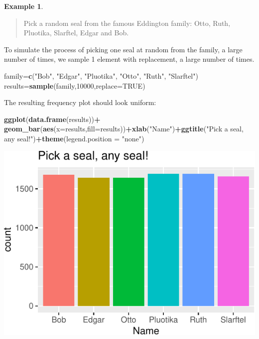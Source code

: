\documentclass[
]{book}
\newenvironment{Shaded}{\begin{snugshade}}{\end{snugshade}}
\newcommand{\AttributeTok}[1]{\textcolor[rgb]{0.13,0.29,0.53}{#1}}
\newcommand{\ConstantTok}[1]{\textcolor[rgb]{0.56,0.35,0.01}{#1}}
\newcommand{\DecValTok}[1]{\textcolor[rgb]{0.00,0.00,0.81}{#1}}
\newcommand{\FunctionTok}[1]{\textcolor[rgb]{0.13,0.29,0.53}{\textbf{#1}}}
\newcommand{\NormalTok}[1]{#1}
\newcommand{\OtherTok}[1]{\textcolor[rgb]{0.56,0.35,0.01}{#1}}
\newcommand{\SpecialCharTok}[1]{\textcolor[rgb]{0.81,0.36,0.00}{\textbf{#1}}}
\newcommand{\StringTok}[1]{\textcolor[rgb]{0.31,0.60,0.02}{#1}}
\theoremstyle{definition}
\theoremstyle{definition}
\newtheorem{example}{Example}[chapter]
\theoremstyle{definition}
\theoremstyle{definition}
\theoremstyle{remark}
\begin{document}
\begin{example}
\protect\hypertarget{exm:seals-uniform-R}{}\label{exm:seals-uniform-R}\leavevmode

\begin{quote}
Pick a random seal from the famous Eddington family: Otto, Ruth, Pluotika, Slarftel, Edgar and Bob.
\end{quote}

To simulate the process of picking one seal at random from the family, a large number of times, we sample 1 element with replacement, a large number of times.

\begin{Shaded}
\begin{Highlighting}[]
\NormalTok{family}\OtherTok{=}\FunctionTok{c}\NormalTok{(}\StringTok{"Bob"}\NormalTok{, }\StringTok{"Edgar"}\NormalTok{, }\StringTok{"Pluotika"}\NormalTok{, }\StringTok{"Otto"}\NormalTok{, }\StringTok{"Ruth"}\NormalTok{, }\StringTok{"Slarftel"}\NormalTok{)}
\NormalTok{results}\OtherTok{=}\FunctionTok{sample}\NormalTok{(family,}\DecValTok{10000}\NormalTok{,}\AttributeTok{replace=}\ConstantTok{TRUE}\NormalTok{)}
\end{Highlighting}
\end{Shaded}

The resulting frequency plot should look uniform:

\begin{Shaded}
\begin{Highlighting}[]
\FunctionTok{ggplot}\NormalTok{(}\FunctionTok{data.frame}\NormalTok{(results))}\SpecialCharTok{+}
  \FunctionTok{geom\_bar}\NormalTok{(}\FunctionTok{aes}\NormalTok{(}\AttributeTok{x=}\NormalTok{results,}\AttributeTok{fill=}\NormalTok{results))}\SpecialCharTok{+}\FunctionTok{xlab}\NormalTok{(}\StringTok{"Name"}\NormalTok{)}\SpecialCharTok{+}\FunctionTok{ggtitle}\NormalTok{(}\StringTok{"Pick a seal, any seal!"}\NormalTok{)}\SpecialCharTok{+}\FunctionTok{theme}\NormalTok{(}\AttributeTok{legend.position =} \StringTok{"none"}\NormalTok{)}
\end{Highlighting}
\end{Shaded}

\includegraphics{math340-notes_files/figure-latex/unnamed-chunk-164-1.pdf}


\end{example}
\end{document}
